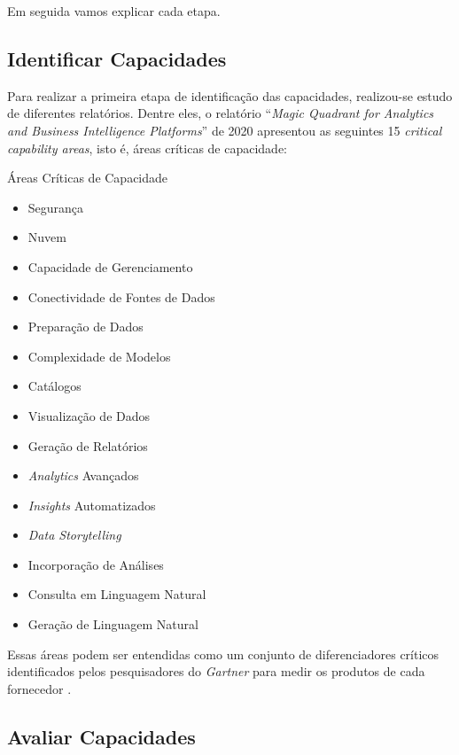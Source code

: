 Em seguida vamos explicar cada etapa.

\subsection{Identificar Capacidades}

Para realizar a primeira etapa de identificação das capacidades, realizou-se estudo de diferentes relatórios. Dentre eles, o relatório ``\emph{Magic Quadrant for Analytics and Business Intelligence Platforms}'' de 2020 \cite{gartner:magicquadrant} apresentou as seguintes 15 \emph{critical capability areas}, isto é, áreas críticas de capacidade:

\begin{env-destaque}{Áreas Críticas de Capacidade}
 \begin{multicols}{2}
    \begin{itemize}
        \item Segurança
        \item Nuvem
        \item Capacidade de Gerenciamento
        \item Conectividade de Fontes de Dados
        \item Preparação de Dados
        \item Complexidade de Modelos
        \item Catálogos
        \item Visualização de Dados
        \item Geração de Relatórios
        \item \emph{Analytics} Avançados
        \item \emph{Insights} Automatizados
        \item \emph{Data Storytelling}
        \item Incorporação de Análises
        \item Consulta em Linguagem Natural
        \item Geração de Linguagem Natural
    \end{itemize}
 \end{multicols}
\end{env-destaque}

Essas áreas podem ser entendidas como um conjunto de diferenciadores críticos identificados pelos pesquisadores do \emph{Gartner} para medir os produtos de cada fornecedor \cite[8]{analisegartner2020}.

\subsection{Avaliar Capacidades}
\label{sec-moscow}

